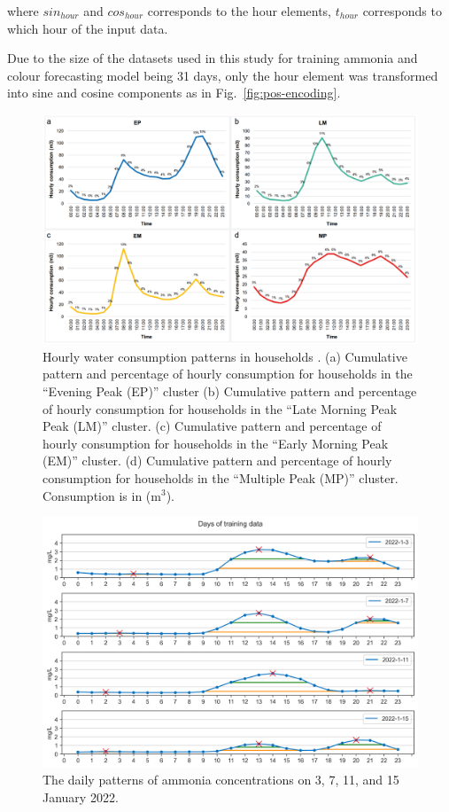 \noindent
where $sin_{hour}$ and $cos_{hour}$ corresponds to the hour elements, $t_{hour}$ corresponds to which hour of the input data.

Due to the size of the datasets used in this study for training ammonia and colour forecasting model being 31 days, only the hour element was transformed into sine and cosine components as in Fig.~\ref{fig:pos-encoding}.

\begin{figure}[!ht]
    \centering
    \includegraphics[width=0.8\columnwidth]{imgs/pre-processing/hourly-consumption-pattern.png}
    \caption{Hourly water consumption patterns in households \citep{abu-bakarQuantifyingImpactCOVID192021}. (a) Cumulative pattern and percentage of hourly consumption for households in the “Evening Peak (EP)” cluster (b) Cumulative pattern and percentage of hourly consumption for households in the “Late Morning Peak Peak (LM)” cluster. (c) Cumulative pattern and percentage of hourly consumption for households in the “Early Morning Peak (EM)” cluster. (d) Cumulative pattern and percentage of hourly consumption for households in the “Multiple Peak (MP)” cluster. Consumption is in (m$^3$).}
    \label{fig:water-consumption-pattern}
 \end{figure}

\begin{figure}[!ht]
  \centering
  \includegraphics[width=0.8\columnwidth]{imgs/results/nh3-pattern.png}
  \caption{The daily patterns of ammonia concentrations on 3, 7, 11, and 15 January 2022.}
  \label{fig:nh3-peak-pattern}
\end{figure}


